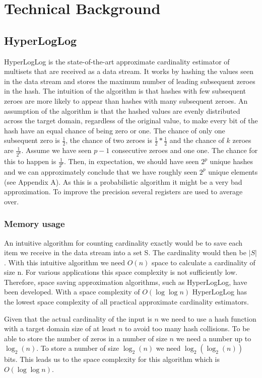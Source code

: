 \chapter{Technical Background}

\section{HyperLogLog}
HyperLogLog is the state-of-the-art approximate cardinality estimator of multisets that are received as a data stream. It works by hashing the values seen in the data stream and stores the maximum number of leading subsequent zeroes in the hash. The intuition of the algorithm is that hashes with few subsequent zeroes are more likely to appear than hashes with many subsequent zeroes. An assumption of the algorithm is that the hashed values are evenly distributed across the target domain, regardless of the original value, to make every bit of the hash have an equal chance of being zero or one. The chance of only one subsequent zero is $\frac{1}{2}$, the chance of two zeroes is $\frac{1}{2}*\frac{1}{2}$ and the chance of $k$ zeroes are $\frac {1} {2^k}$. Assume we have seen $p-1$ consecutive zeroes and one one. The chance for this to happen is $\frac{1}{2^p}$. Then, in expectation, we should have seen $2^p$ unique hashes and we can approximately conclude that we have roughly seen $2^p$ unique elements (see Appendix A). As this is a probabilistic algorithm it might be a very bad approximation. To improve the precision several registers are used to average over. \cite{hyperloglog}

\subsection{Memory usage}
An intuitive algorithm for counting cardinality exactly would be to save each item we receive in the data stream into a set S. The cardinality would then be $|S|$. With this intuitive algorithm we need $O(n)$ space to calculate a cardinality of size n. For various applications this space complexity is not sufficiently low. Therefore, space saving approximation algorithms, such as HyperLogLog, have been developed. With a space complexity of $O(\log\log n)$ HyperLogLog has the lowest space complexity of all practical approximate cardinality estimators. 

Given that the actual cardinality of the input is $n$ we need to use a hash function with a target domain size of at least $n$ to avoid too many hash collisions. To be able to store the number of zeros in a number of size $n$ we need a number up to $\log_2(n)$. To store a number of size $\log_2(n)$ we need $\log_2(\log_2(n))$ bits. This leads us to the space complexity for this algorithm which is $O(\log\log n)$. \cite{hyperloglog}


